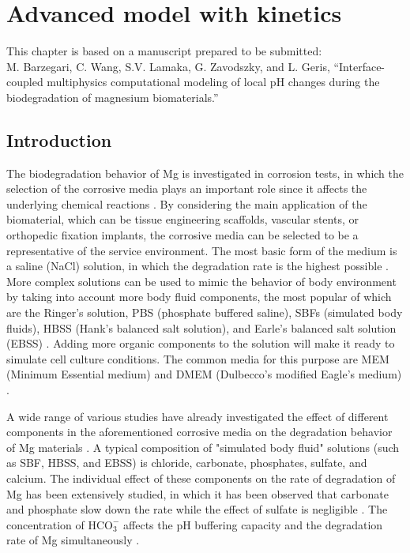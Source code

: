 \chapter{Advanced model with kinetics}\label{ch:kinetics}


\begin{shaded}
This chapter is based on a manuscript prepared to be submitted:\\
M. Barzegari, C. Wang, S.V. Lamaka, G. Zavodszky, and L. Geris, ``Interface-coupled multiphysics computational modeling of local pH changes during the biodegradation of magnesium biomaterials.''
\end{shaded}

\section{Introduction}

The biodegradation behavior of Mg is investigated in corrosion tests, in which the selection of the corrosive media plays an important role since it affects the underlying chemical reactions \cite{Mei2020}. By considering the main application of the biomaterial, which can be tissue engineering scaffolds, vascular stents, or orthopedic fixation implants, the corrosive media can be selected to be a representative of the service environment. The most basic form of the medium is a saline (NaCl) solution, in which the degradation rate is the highest possible \cite{Mei2020}. More complex solutions can be used to mimic the behavior of body environment by taking into account more body fluid components, the most popular of which are the Ringer's solution, PBS (phosphate buffered saline), SBFs (simulated body fluids), HBSS (Hank's balanced salt solution), and Earle's balanced salt solution (EBSS) \cite{Mei2020}. Adding more organic components to the solution will make it ready to simulate cell culture conditions. The common media for this purpose are MEM (Minimum Essential medium) and DMEM (Dulbecco's modified Eagle's medium) \cite{Mei2020}.

A wide range of various studies have already investigated the effect of different components in the aforementioned corrosive media on the degradation behavior of Mg materials \cite{Mei2019,Zeng2014,Johnston2017, Lamaka2018,Mei2019a}. A typical composition of "simulated body fluid" solutions (such as SBF, HBSS, and EBSS) is chloride, carbonate, phosphates, sulfate, and calcium. The individual effect of these components on the rate of degradation of Mg has been extensively studied, in which it has been observed that carbonate and phosphate slow down the rate while the effect of sulfate is negligible \cite{Johnston2017,Mei2019a}. The concentration of $\mathrm{HCO}_{3}^{-}$ affects the pH buffering capacity and the degradation rate of Mg simultaneously \cite{Xin2011}.

